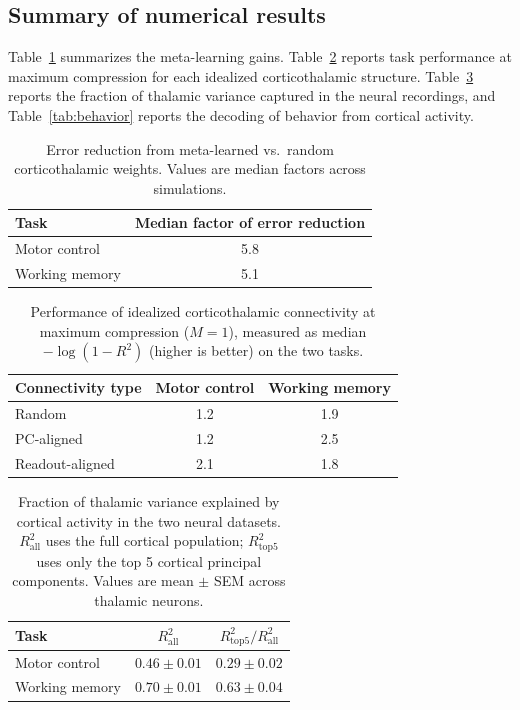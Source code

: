 \documentclass[11pt]{article}
\begin{document}
\subsection{Summary of numerical results}

Table~\ref{tab:metalearning} summarizes the meta-learning gains.
Table~\ref{tab:idealized} reports task performance at maximum
compression for each idealized corticothalamic structure.
Table~\ref{tab:variance} reports the fraction of thalamic variance
captured in the neural recordings, and Table~\ref{tab:behavior}
reports the decoding of behavior from cortical activity.

\begin{table}[htbp]
\centering
\caption{Error reduction from meta-learned vs.\ random corticothalamic
weights. Values are median factors across simulations.}
\label{tab:metalearning}
\begin{tabular}{lc}
\toprule
Task & Median factor of error reduction \\
\midrule
Motor control & 5.8 \\
Working memory & 5.1 \\
\bottomrule
\end{tabular}
\end{table}

\begin{table}[htbp]
\centering
\caption{Performance of idealized corticothalamic connectivity at
maximum compression ($M = 1$), measured as median $-\log(1 - R^2)$
(higher is better) on the two tasks.}
\label{tab:idealized}
\begin{tabular}{lcc}
\toprule
Connectivity type & Motor control & Working memory \\
\midrule
Random  & 1.2 & 1.9 \\
PC-aligned & 1.2 & 2.5 \\
Readout-aligned & 2.1 & 1.8 \\
\bottomrule
\end{tabular}
\end{table}

\begin{table}[htbp]
\centering
\caption{Fraction of thalamic variance explained by cortical activity
in the two neural datasets. $R^2_\text{all}$ uses the full cortical
population; $R^2_\text{top5}$ uses only the top 5 cortical principal
components. Values are mean $\pm$ SEM across thalamic neurons.}
\label{tab:variance}
\begin{tabular}{lcc}
\toprule
Task & $R^2_\text{all}$ & $R^2_\text{top5}/R^2_\text{all}$ \\
\midrule
Motor control  & $0.46 \pm 0.01$ & $0.29 \pm 0.02$ \\
Working memory & $0.70 \pm 0.01$ & $0.63 \pm 0.04$ \\
\bottomrule
\end{tabular}
\end{table}
\end{document}
